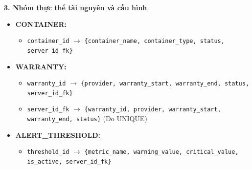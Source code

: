 {\textbf{3. Nhóm thực thể tài nguyên và cấu hình}
\begin{itemize}
    \item \textbf{CONTAINER:}
    \begin{itemize}
        \item \texttt{container\_id} $\rightarrow$ \texttt{\{container\_name, container\_type, status, server\_id\_fk\}}
    \end{itemize}
    \item \textbf{WARRANTY:}
    \begin{itemize}
        \item \texttt{warranty\_id} $\rightarrow$ \texttt{\{provider, warranty\_start, warranty\_end, status, server\_id\_fk\}}
        \item \texttt{server\_id\_fk} $\rightarrow$ \texttt{\{warranty\_id, provider, warranty\_start, warranty\_end, status\}} (Do UNIQUE)
    \end{itemize}
    \item \textbf{ALERT\_THRESHOLD:}
    \begin{itemize}
        \item \texttt{threshold\_id} $\rightarrow$ \texttt{\{metric\_name, warning\_value, critical\_value, is\_active, server\_id\_fk\}}
    \end{itemize}
\end{itemize}

}
